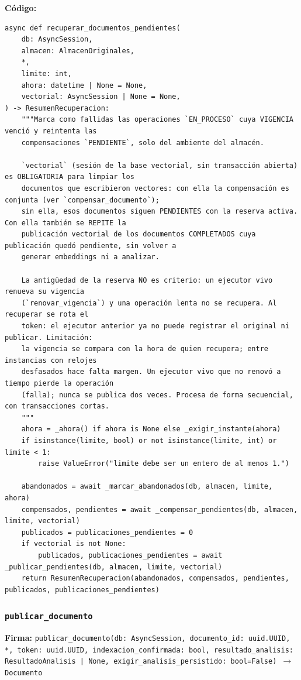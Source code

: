 \documentclass[11pt,a4paper]{article}
\begin{document}
\textbf{Código:}
\begin{lstlisting}
async def recuperar_documentos_pendientes(
    db: AsyncSession,
    almacen: AlmacenOriginales,
    *,
    limite: int,
    ahora: datetime | None = None,
    vectorial: AsyncSession | None = None,
) -> ResumenRecuperacion:
    """Marca como fallidas las operaciones `EN_PROCESO` cuya VIGENCIA venció y reintenta las
    compensaciones `PENDIENTE`, solo del ambiente del almacén.

    `vectorial` (sesión de la base vectorial, sin transacción abierta) es OBLIGATORIA para limpiar los
    documentos que escribieron vectores: con ella la compensación es conjunta (ver `compensar_documento`);
    sin ella, esos documentos siguen PENDIENTES con la reserva activa. Con ella también se REPITE la
    publicación vectorial de los documentos COMPLETADOS cuya publicación quedó pendiente, sin volver a
    generar embeddings ni a analizar.

    La antigüedad de la reserva NO es criterio: un ejecutor vivo renueva su vigencia
    (`renovar_vigencia`) y una operación lenta no se recupera. Al recuperar se rota el
    token: el ejecutor anterior ya no puede registrar el original ni publicar. Limitación:
    la vigencia se compara con la hora de quien recupera; entre instancias con relojes
    desfasados hace falta margen. Un ejecutor vivo que no renovó a tiempo pierde la operación
    (falla); nunca se publica dos veces. Procesa de forma secuencial, con transacciones cortas.
    """
    ahora = _ahora() if ahora is None else _exigir_instante(ahora)
    if isinstance(limite, bool) or not isinstance(limite, int) or limite < 1:
        raise ValueError("limite debe ser un entero de al menos 1.")

    abandonados = await _marcar_abandonados(db, almacen, limite, ahora)
    compensados, pendientes = await _compensar_pendientes(db, almacen, limite, vectorial)
    publicados = publicaciones_pendientes = 0
    if vectorial is not None:
        publicados, publicaciones_pendientes = await _publicar_pendientes(db, almacen, limite, vectorial)
    return ResumenRecuperacion(abandonados, compensados, pendientes, publicados, publicaciones_pendientes)
\end{lstlisting}

\subsubsection*{\texttt{publicar\_documento}}
\textbf{Firma:} \texttt{publicar\_documento(db: AsyncSession, documento\_id: uuid.UUID, *, token: uuid.UUID, indexacion\_confirmada: bool, resultado\_analisis: ResultadoAnalisis | None, exigir\_analisis\_persistido: bool=False) $\rightarrow$ Documento}
\end{document}
